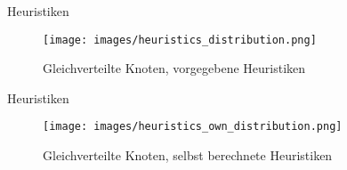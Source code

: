 \begin{frame}{Heuristiken}
    \begin{figure}
        \centering
        \texttt{[image: images/heuristics\_distribution.png]}
        \caption{Gleichverteilte Knoten, vorgegebene Heuristiken}        
    \end{figure}
\end{frame}

\begin{frame}{Heuristiken}
    \begin{figure}
        \centering
        \texttt{[image: images/heuristics\_own\_distribution.png]}
        \caption{Gleichverteilte Knoten, selbst berechnete Heuristiken} 
    \end{figure}
\end{frame}


